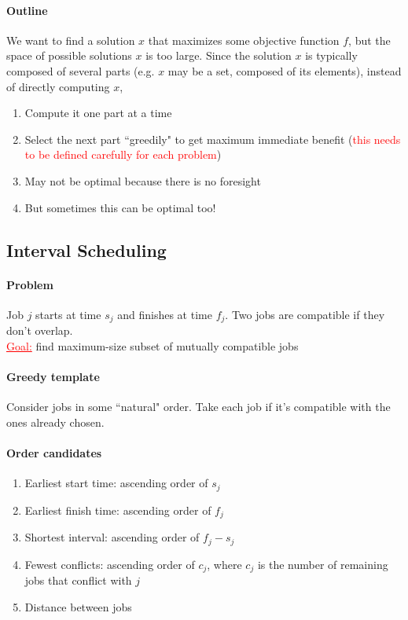 \documentclass[11pt]{article}
\newcommand{\under}[1]{\underline{#1}}
\begin{document}
\paragraph{Outline}
We want to find a solution $x$ that maximizes some objective function $f$, but the space of possible solutions $x$ is too large. Since the solution $x$ is typically composed of several parts (e.g. $x$ may be a set, composed of its elements), instead of directly computing $x$,
\begin{enumerate}
	\item Compute it one part at a time
	\item Select the next part ``greedily" to get maximum immediate benefit (\textcolor{red}{this needs to be defined carefully for each problem})
	\item May not be optimal because there is no foresight
	\item But sometimes this can be optimal too!
\end{enumerate}

\subsection{Interval Scheduling}
\paragraph{Problem}
Job $j$ starts at time $s_j$ and finishes at time $f_j$. Two jobs are compatible if they don't overlap. \\
\textcolor{red}{\under{Goal:}} find maximum-size subset of mutually compatible jobs

\paragraph{Greedy template}
Consider jobs in some ``natural" order. Take each job if it's compatible with the ones already chosen.

\paragraph{Order candidates}
\begin{enumerate}
	\item Earliest start time: ascending order of $s_j$
	\item Earliest finish time: ascending order of $f_j$
	\item Shortest interval: ascending order of $f_j - s_j$
	\item Fewest conflicts: ascending order of $c_j$, where $c_j$ is the number of remaining jobs that conflict with $j$
	\item Distance between jobs
\end{enumerate}
\end{document}
